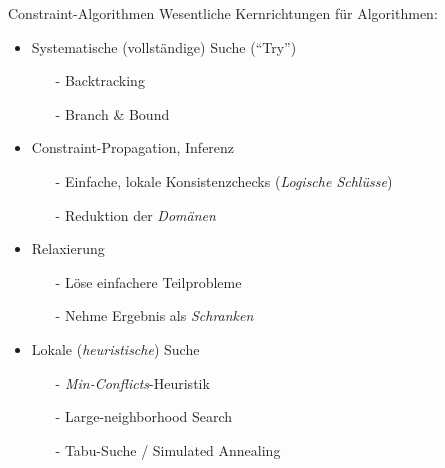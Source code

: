 \documentclass[handout,10pt,xcolor={dvipsnames},fleqn]{beamer}
\begin{document}
\begin{frame}{Constraint-Algorithmen}
Wesentliche Kernrichtungen für Algorithmen:

\vspace*{2ex}

\begin{itemize}
\item \alert{Systematische} (vollständige) Suche (``\alert{Try}'')
\begin{itemize}
\item[-] Backtracking
\item[-] Branch \& Bound
\end{itemize} \pause

\vspace*{1ex}

\item Constraint-\alert{Propagation}, Inferenz
\begin{itemize}
\item[-] Einfache, lokale Konsistenzchecks (\emph{Logische Schlüsse})
\item[-] \alert{Reduktion} der \emph{Domänen}
\end{itemize} \pause

\vspace*{1ex}

\item \alert{Relaxierung}
\begin{itemize}
\item[-] Löse einfachere Teilprobleme
\item[-] Nehme Ergebnis als \emph{Schranken}
\end{itemize} \pause

\vspace*{1ex}

\item \alert{Lokale} (\emph{heuristische}) Suche
\begin{itemize}
\item[-] \emph{Min-Conflicts}-Heuristik
\item[-] Large-neighborhood Search
\item[-] Tabu-Suche / Simulated Annealing
\end{itemize}
\end{itemize}
\end{frame}
\end{document}
